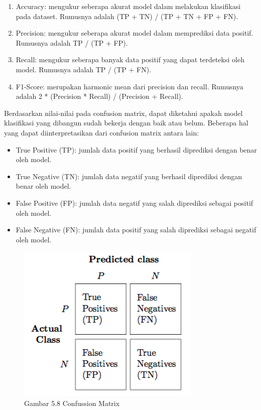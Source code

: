 \documentclass[
  letterpaper,
  DIV=11,
  numbers=noendperiod]{scrreprt}
\providecommand{\tightlist}{%
  \setlength{\itemsep}{0pt}\setlength{\parskip}{0pt}}\usepackage{longtable,booktabs,array}
\begin{document}
\begin{enumerate}
\def\labelenumi{\alph{enumi}.}
\tightlist
\item
  Accuracy: mengukur seberapa akurat model dalam melakukan klasifikasi
  pada dataset. Rumusnya adalah (TP + TN) / (TP + TN + FP + FN).\\
\item
  Precision: mengukur seberapa akurat model dalam memprediksi data
  positif. Rumusnya adalah TP / (TP + FP).\\
\item
  Recall: mengukur seberapa banyak data positif yang dapat terdeteksi
  oleh model. Rumusnya adalah TP / (TP + FN).\\
\item
  F1-Score: merupakan harmonic mean dari precision dan recall. Rumusnya
  adalah 2 * (Precision * Recall) / (Precision + Recall).
\end{enumerate}

Berdasarkan nilai-nilai pada confusion matrix, dapat diketahui apakah
model klasifikasi yang dibangun sudah bekerja dengan baik atau belum.
Beberapa hal yang dapat diinterpretasikan dari confusion matrix antara
lain:

\begin{itemize}
\tightlist
\item
  True Positive (TP): jumlah data positif yang berhasil diprediksi
  dengan benar oleh model.\\
\item
  True Negative (TN): jumlah data negatif yang berhasil diprediksi
  dengan benar oleh model.\\
\item
  False Positive (FP): jumlah data negatif yang salah diprediksi sebagai
  positif oleh model.\\
\item
  False Negative (FN): jumlah data positif yang salah diprediksi sebagai
  negatif oleh model.
\end{itemize}

\begin{figure}

{\centering \includegraphics{Asset/confusion_matrix.png}

}

\caption{Gambar 5.8 Confussion Matrix}

\end{figure}
\end{document}
